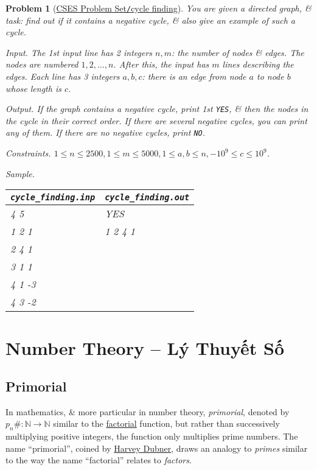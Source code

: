 \documentclass{article}
\newtheorem{problem}{Problem}
\begin{document}
\begin{problem}[\href{https://cses.fi/problemset/task/1197}{CSES Problem Set{\tt/}cycle finding}]
	You are given a directed graph, \& task: find out if it contains a negative cycle, \& also give an example of such a cycle.
	\item {\sf Input.} The 1st input line has 2 integers $n,m$: the number of nodes \& edges. The nodes are numbered $1,2,\ldots,n$. After this, the input has $m$ lines describing the edges. Each line has 3 integers $a,b,c$: there is an edge from node $a$ to node $b$ whose length is $c$.
	\item {\sf Output.} If the graph contains a negative cycle, print 1st {\tt YES}, \& then the nodes in the cycle in their correct order. If there are several negative cycles, you can print any of them. If there are no negative cycles, print {\tt NO}.
	\item {\sf Constraints.} $1\le n\le2500,1\le m\le5000,1\le a,b\le n,-10^9\le c\le10^9$.
	\item {\sf Sample.}
	\begin{table}[H]
		\centering
		\begin{tabular}{|l|l|}
			\hline
			\verb|cycle_finding.inp| & \verb|cycle_finding.out| \\
			\hline
			4 5 & YES \\
			1 2 1 & 1 2 4 1 \\
			2 4 1 & \\
			3 1 1 & \\
			4 1 -3 & \\
			4 3 -2 & \\
			\hline
		\end{tabular}
	\end{table}
\end{problem}


\section{Number Theory -- Lý Thuyết Số}


\subsection{Primorial}
In mathematics, \& more particular in number theory, {\it primorial}, denoted by $p_n\#:\mathbb{N}\to\mathbb{N}$ similar to the \href{https://en.wikipedia.org/wiki/Factorial}{factorial} function, but rather than successively multiplying positive integers, the function only multiplies prime numbers. The name ``primorial'', coined by \href{https://en.wikipedia.org/wiki/Harvey_Dubner}{\sc Harvey Dubner}, draws an analogy to {\it primes} similar to the way the name ``factorial'' relates to {\it factors}.
\end{document}
